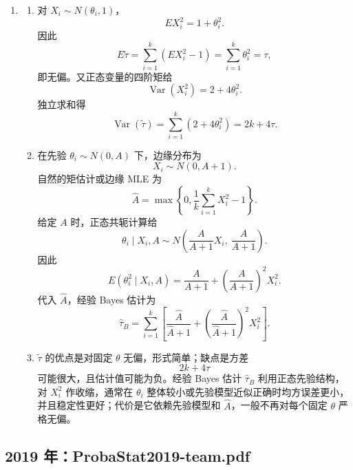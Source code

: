 \documentclass[UTF8,12pt]{ctexart}
\begin{document}
\begin{enumerate}[label=\textbf{\arabic*.},leftmargin=2.2em]
\item
\begin{enumerate}[label=\textbf{(\arabic*)},leftmargin=2.4em]
\item 对 \(X_i\sim N(\theta_i,1)\)，
\[
E X_i^2=1+\theta_i^2.
\]
因此
\[
E\widetilde\tau=\sum_{i=1}^k(E X_i^2-1)=\sum_{i=1}^k\theta_i^2=\tau,
\]
即无偏。又正态变量的四阶矩给
\[
\operatorname{Var}(X_i^2)=2+4\theta_i^2.
\]
独立求和得
\[
\operatorname{Var}(\widetilde\tau)
=\sum_{i=1}^k(2+4\theta_i^2)
=2k+4\tau.
\]
\item 在先验 \(\theta_i\sim N(0,A)\) 下，边缘分布为
\[
X_i\sim N(0,A+1).
\]
自然的矩估计或边缘 MLE 为
\[
\widehat A=\max\left\{0,\frac1k\sum_{i=1}^kX_i^2-1\right\}.
\]
给定 \(A\) 时，正态共轭计算给
\[
\theta_i\mid X_i,A\sim
N\left(\frac{A}{A+1}X_i,\ \frac{A}{A+1}\right).
\]
因此
\[
E(\theta_i^2\mid X_i,A)
=\frac{A}{A+1}+\left(\frac{A}{A+1}\right)^2X_i^2.
\]
代入 \(\widehat A\)，经验 Bayes 估计为
\[
\widehat\tau_B
=\sum_{i=1}^k
\left[
\frac{\widehat A}{\widehat A+1}
+\left(\frac{\widehat A}{\widehat A+1}\right)^2X_i^2
\right].
\]
\item \(\widetilde\tau\) 的优点是对固定 \(\theta\) 无偏，形式简单；缺点是方差
\[
2k+4\tau
\]
可能很大，且估计值可能为负。经验 Bayes 估计 \(\widehat\tau_B\) 利用正态先验结构，对 \(X_i^2\) 作收缩，通常在 \(\theta_i\) 整体较小或先验模型近似正确时均方误差更小，并且稳定性更好；代价是它依赖先验模型和 \(\widehat A\)，一般不再对每个固定 \(\theta\) 严格无偏。
\end{enumerate}
\end{enumerate}


\subsection{2019 年：ProbaStat2019-team.pdf}
\end{document}
